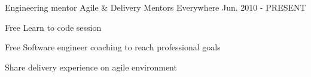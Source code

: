

\begin{cventries}

  \cventry
    {Engineering mentor} %
    {Agile \& Delivery Mentors} %
    {Everywhere} %
    {Jun. 2010 - PRESENT} %
    {
      \begin{cvitems} %
        \item {Free Learn to code session}
        \item {Free Software engineer coaching to reach professional goals}
        \item {Share delivery experience on  agile environment}
      \end{cvitems}
    }


\end{cventries}
